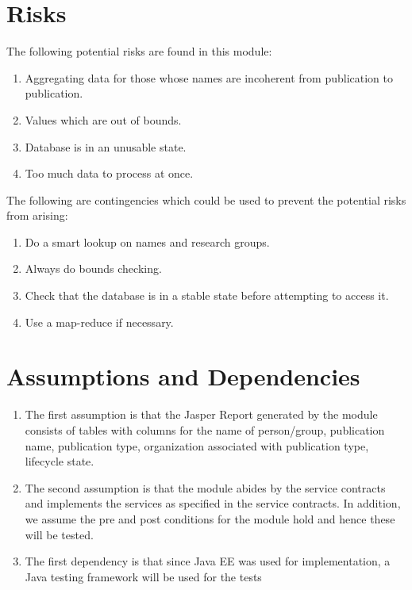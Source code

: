 \section{Risks}
	The following potential risks are found in this module:
\begin{enumerate}
	\item Aggregating data for those whose names are incoherent from publication to publication.
	\item Values  which are out of bounds.
	\item Database is in an unusable state.
	\item Too much data to process at once.
\end{enumerate}

	The following are contingencies which could be used to prevent the potential risks from arising:
\begin{enumerate}

	\item Do a smart lookup on names and research groups.
	\item Always do bounds checking.
	\item Check that the database is in a stable state before attempting to access it.
	\item Use a map-reduce if necessary.
         

\end{enumerate}


\section{Assumptions and Dependencies}

\begin{enumerate}
	\item The first assumption is that the Jasper Report generated by the module consists of tables with columns for the name of person/group, publication name, publication type, organization associated with publication type, lifecycle state.
	\item The second assumption is that the module abides by the service contracts and implements the services as specified in the service contracts. In addition, we assume the pre and post conditions for the module hold and hence these will be tested.
	\item The first dependency is that since Java EE was used for implementation, a Java testing framework will be used for the tests
\end{enumerate}